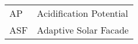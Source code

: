 \begin{table}[h]
\begin{tabular}{ll}
AP  & Acidification Potential\\
ASF & Adaptive Solar Facade\\

\end{tabular}\hfill\
\end{table}